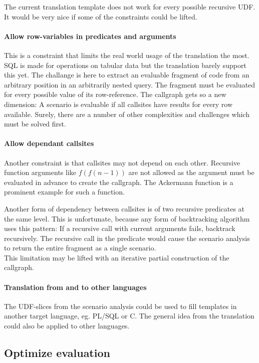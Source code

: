 The current translation template does not work for every possible recursive UDF. It would be very nice if some of the constraints could be lifted.

\paragraph*{Allow row-variables in predicates and arguments}
This is a constraint that limits the real world usage of the translation the most. SQL is made for operations on tabular data but the translation barely support this yet. The challange is here to extract an evaluable fragment of code from an arbitrary position in an arbitrarily nested query. The fragment must be evaluated for every possible value of its row-reference. The callgraph gets so a new dimension: A scenario is evaluable if all callsites have results for every row available. Surely, there are a number of other complexities and challenges which must be solved first.

\paragraph*{Allow dependant callsites}
Another constraint is that callsites may not depend on each other. Recursive function arguments like $f(f(n-1))$ are not allowed as the argument must be evaluated in advance to create the callgraph. The Ackermann function is a prominent example for such a function.

Another form of dependency between callsites is of two recursive predicates at the same level. This is unfortunate, because any form of backtracking algorithm uses this pattern: If a recursive call with current arguments fails, backtrack recursively. The recursive call in the predicate would cause the scenario analysis to return the entire fragment as a single scenario.\\
This limitation may be lifted with an iterative partial construction of the callgraph.

\paragraph*{Translation from and to other languages}

The UDF-slices from the scenario analysis could be used to fill templates in another target language, eg. PL/SQL or C. The general idea from the translation could also be applied to other languages.

\subsection{Optimize evaluation}

